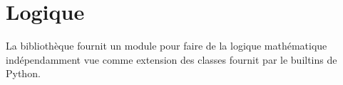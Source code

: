 \chapter{Logique}
La bibliothèque fournit un module pour faire de la logique mathématique indépendamment vue comme extension
des classes fournit par le builtins de Python.
